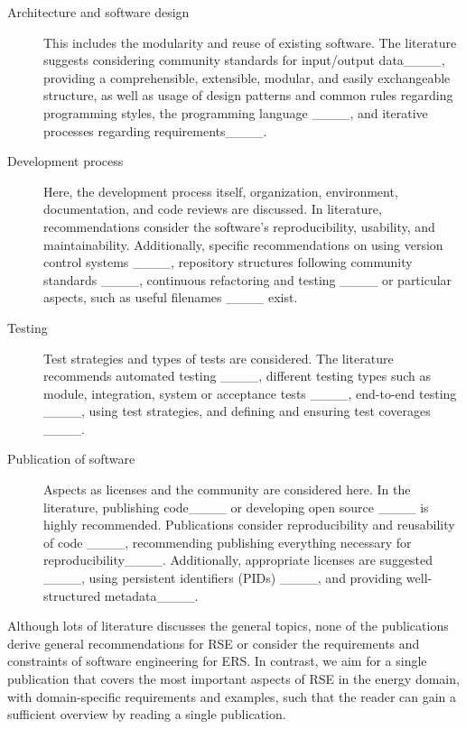 \begin{description}
\item[Architecture and software design] This includes the modularity and reuse of existing software. The literature suggests considering community standards for input/output data____, providing a comprehensible, extensible, modular, and easily exchangeable structure, as well as usage of design patterns and common rules regarding programming styles, the programming language ____, and iterative processes regarding requirements____.
\item[Development process] Here, the development process itself, organization, environment, documentation, and code reviews are discussed. In literature, recommendations consider the software's reproducibility, usability, and maintainability. Additionally, specific recommendations on using version control systems ____, repository structures following community standards ____,  continuous refactoring and testing ____ or particular aspects, such as useful filenames ____ exist.
\item[Testing] Test strategies and types of tests are considered. The literature recommends automated testing ____, different testing types such as module, integration, system or acceptance tests ____, end-to-end testing ____, using test strategies, and defining and ensuring test coverages ____. 
\item[Publication of software] Aspects as licenses and the community are considered here. In the literature, publishing code____ or developing open source ____ is highly recommended. Publications consider reproducibility and reusability of code ____, recommending publishing everything necessary for reproducibility____. Additionally, appropriate licenses are suggested ____, using persistent identifiers (PIDs) ____, and providing well-structured metadata____.
\end{description}

Although lots of literature discusses the general topics, none of the publications derive general recommendations for \ac{RSE} or 
consider the requirements and constraints of software engineering for \ac{ERS}. 
In contrast, we aim for a single publication that covers the most important aspects of \ac{RSE} in the energy domain, with domain-specific requirements and examples, such that the reader can gain a sufficient overview by reading a single publication.